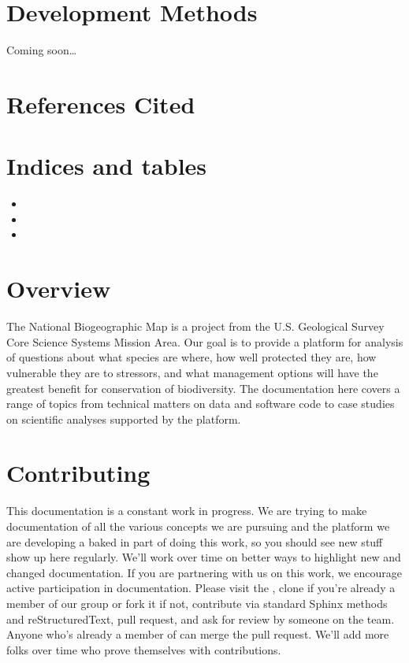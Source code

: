 \documentclass[letterpaper,10pt,english]{sphinxmanual}
\begin{document}
\chapter{Development Methods}
\label{\detokenize{devmethods:development-methods}}\label{\detokenize{devmethods:devmethods}}\label{\detokenize{devmethods::doc}}
Coming soon…


\chapter{References Cited}
\label{\detokenize{references:references-cited}}\label{\detokenize{references::doc}}

\chapter{Indices and tables}
\label{\detokenize{index:indices-and-tables}}\begin{itemize}
\item {} 

\item {} 

\item {} 

\end{itemize}


\chapter{Overview}
\label{\detokenize{index:overview}}
The National Biogeographic Map is a project from the U.S. Geological Survey Core Science Systems Mission Area. Our goal is to provide a platform for analysis of questions about what species are where, how well protected they are, how vulnerable they are to stressors, and what management options will have the greatest benefit for conservation of biodiversity. The documentation here covers a range of topics from technical matters on data and software code to case studies on scientific analyses supported by the platform.


\chapter{Contributing}
\label{\detokenize{index:contributing}}
This documentation is a constant work in progress. We are trying to make documentation of all the various concepts we are pursuing and the platform we are developing a baked in part of doing this work, so you should see new stuff show up here regularly. We’ll work over time on better ways to highlight new and changed documentation. If you are partnering with us on this work, we encourage active participation in documentation. Please visit the , clone if you’re already a member of our group or fork it if not, contribute via standard Sphinx methods and reStructuredText, pull request, and ask for review by someone on the team. Anyone who’s already a member of  can merge the pull request. We’ll add more folks over time who prove themselves with contributions.
\end{document}
